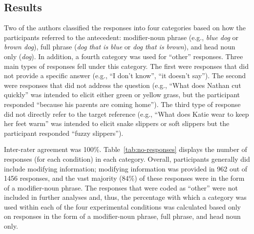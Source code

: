 \documentclass[output=paper]{langsci/langscibook}
\begin{document}
\subsection{Results}

Two of the authors classified the responses into four categories based
on how the participants referred to the antecedent: modifier-noun
phrase (e.g., \textit{blue dog} or \textit{brown dog}), full phrase
(\textit{dog that is blue} or \textit{dog that is brown}), and head
noun only (\textit{dog}). In addition, a fourth category was used for
“other” responses. Three main types of responses fell under this
category.  The first were responses that did not provide a specific
answer (e.g., “I don’t know”, “it doesn’t say”). The second were
responses that did not address the question (e.g.,
“What does Nathan cut quickly” was intended to elicit either green or
yellow grass, but the participant responded “because his parents are
coming home”).
The third type of response did not directly refer to the target
reference (e.g.,
“What does Katie wear to keep her feet warm” was intended to elicit
snake slippers or soft slippers but the participant responded “fuzzy
slippers”).

Inter-rater agreement was 100\%. Table~\ref{tab:no-responses} displays
the number of responses (for each condition) in each
category. Overall, participants generally did include modifying
information; modifying information was provided in 962 out of 1456
responses, and the vast majority (84\%) of these responses were in the
form of a modifier-noun phrase. The responses that were coded as ``other''
were not included in further analyses and, thus, the percentage with
which a category was used within each of the four experimental
conditions was calculated based only on responses in the form of a
modifier-noun phrase, full phrase, and head noun only.
\end{document}
